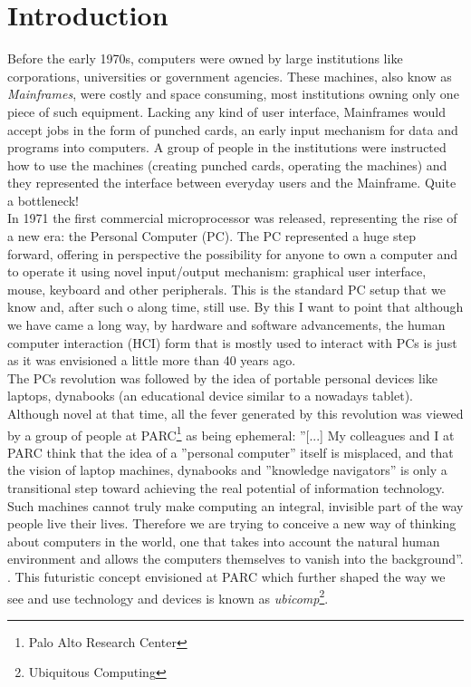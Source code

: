 \chapter{Introduction}\label{ch:introduction}

Before the early 1970s, computers were owned by large institutions like corporations, universities or government agencies. These machines, also know as \emph{Mainframes}, were costly and space consuming, most institutions owning only one piece of such equipment. Lacking any kind of user interface, Mainframes would accept jobs in the form of punched cards, an early input mechanism for data and programs into computers. A group of people in the institutions were instructed how to use the machines (creating punched cards, operating the machines) and they represented the interface between everyday users and the Mainframe. Quite a bottleneck!\\

In 1971 the first commercial microprocessor was released, representing the rise of a new era: the Personal Computer (PC). The PC represented a huge step forward, offering in perspective the possibility for anyone to own a computer and to operate it using novel input/output mechanism: graphical user interface, mouse, keyboard and other peripherals. This is the standard PC setup that we know and, after such o along time, still use. By this I want to point that although we have came a long way, by hardware and software advancements, the human computer interaction (HCI) form that is mostly used to interact with PCs is just as it was envisioned a little more than 40 years ago.\\

The PCs revolution was followed by the idea of portable personal devices like laptops, dynabooks (an educational device similar to a nowadays tablet). Although novel at that time, all the fever generated by this revolution was viewed by a group of people at PARC\footnote{Palo Alto Research Center} as being ephemeral: ''[...] My colleagues and I at PARC think that the idea of a ''personal computer'' itself is misplaced, and that the vision of laptop machines, dynabooks and ''knowledge navigators'' is only a transitional step toward achieving the real potential of information technology. Such machines cannot truly make computing an integral, invisible part of the way people live their lives. Therefore we are trying to conceive a new way of thinking about computers in the world, one that takes into account the natural human environment and allows the computers themselves to vanish into the background''. \cite{weiser1991computer}. This futuristic concept envisioned at PARC which further shaped the way we see and use technology and devices is known as \emph{ubicomp}\footnote{Ubiquitous Computing}.\\

